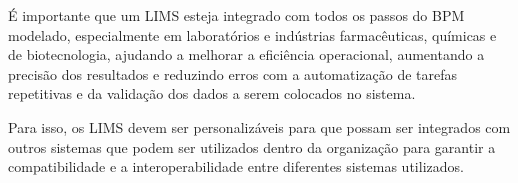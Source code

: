 É importante que um LIMS esteja integrado com todos os passos do BPM modelado, especialmente em laboratórios e indústrias farmacêuticas, químicas e de biotecnologia, ajudando a melhorar a eficiência operacional, aumentando a precisão dos resultados e reduzindo erros com a automatização de tarefas repetitivas e da validação dos dados a serem colocados no sistema.


Para isso, os LIMS devem ser personalizáveis para que possam ser integrados com outros sistemas que podem ser utilizados dentro da organização para garantir a compatibilidade e a interoperabilidade entre diferentes sistemas utilizados.